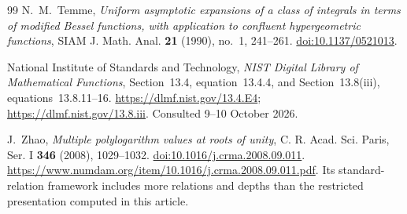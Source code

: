 \begin{thebibliography}{99}
N.~M.~Temme,
\emph{Uniform asymptotic expansions of a class of integrals in terms of
modified Bessel functions, with application to confluent hypergeometric
functions},
SIAM J. Math. Anal. \textbf{21} (1990), no.~1, 241--261.
\href{https://doi.org/10.1137/0521013}{doi:10.1137/0521013}.

National Institute of Standards and Technology,
\emph{NIST Digital Library of Mathematical Functions},
Section~13.4, equation~13.4.4, and Section~13.8(iii),
equations~13.8.11--16.
\url{https://dlmf.nist.gov/13.4.E4};
\url{https://dlmf.nist.gov/13.8.iii}.
Consulted 9--10 October 2026.

J.~Zhao,
\emph{Multiple polylogarithm values at roots of unity},
C. R. Acad. Sci. Paris, Ser. I \textbf{346} (2008), 1029--1032.
\href{https://doi.org/10.1016/j.crma.2008.09.011}
{doi:10.1016/j.crma.2008.09.011}.
\url{https://www.numdam.org/item/10.1016/j.crma.2008.09.011.pdf}.
Its standard-relation framework includes more relations and depths
than the restricted presentation computed in this article.

\end{thebibliography}


